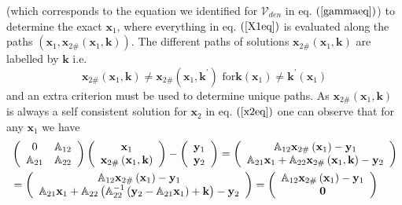 \documentclass[aps,preprint]{revtex4}%
\begin{document}
(which corresponds to the equation we identified for $\mathcal{V}_{den}$ in
eq. $\left(  \ref{gammaeq}\right)  $) to determine the exact $\mathbf{x}_{1}$,
where everything in eq. $\left(  \ref{X1eq}\right)  $ is evaluated along the
paths $\left(  \mathbf{x}_{1},\mathbf{x}_{2\#}\left(  \mathbf{x}%
_{1},\mathbf{k}\right)  \right)  $. The different paths of solutions
$\mathbf{x}_{2\#}\left(  \mathbf{x}_{1},\mathbf{k}\right)  $ are labelled by
$\mathbf{k}$ i.e.
\begin{equation}
\mathbf{x}_{2\#}\left(  \mathbf{x}_{1},\mathbf{k}\right)  \neq\mathbf{x}%
_{2\#}\left(  \mathbf{x}_{1},\mathbf{k}^{\prime}\right)  \text{ for
}\mathbf{k}\left(  \mathbf{x}_{1}\right)  \neq\mathbf{k}^{\prime}\left(
\mathbf{x}_{1}\right)
\end{equation}
and an extra criterion must be used to determine unique paths. As
$\mathbf{x}_{2\#}\left(  \mathbf{x}_{1},\mathbf{k}\right)  $ is always a self
consistent solution for $\mathbf{x}_{2}$ in eq. $\left(  \ref{x2eq}\right)  $
one can observe that for any $\mathbf{x}_{1}$ we have
\begin{align}
&  \left(
\begin{array}
[c]{cc}%
0 & \mathbb{A}_{12}\\
\mathbb{A}_{21} & \mathbb{A}_{22}%
\end{array}
\right)  \left(
\begin{array}
[c]{c}%
\mathbf{x}_{1}\\
\mathbf{x}_{2\#}\left(  \mathbf{x}_{1},\mathbf{k}\right)
\end{array}
\right)  -\left(
\begin{array}
[c]{c}%
\mathbf{y}_{1}\\
\mathbf{y}_{2}%
\end{array}
\right)  =\left(
\begin{array}
[c]{c}%
\mathbb{A}_{12}\mathbf{x}_{2\#}\left(  \mathbf{x}_{1}\right)  -\mathbf{y}%
_{1}\\
\mathbb{A}_{21}\mathbf{x}_{1}+\mathbb{A}_{22}\mathbf{x}_{2\#}\left(
\mathbf{x}_{1},\mathbf{k}\right)  -\mathbf{y}_{2}%
\end{array}
\right) \nonumber\\
&  =\left(
\begin{array}
[c]{c}%
\mathbb{A}_{12}\mathbf{x}_{2\#}\left(  \mathbf{x}_{1}\right)  -\mathbf{y}%
_{1}\\
\mathbb{A}_{21}\mathbf{x}_{1}+\mathbb{A}_{22}\left(  \mathbb{A}_{22}%
^{-1}\left(  \mathbf{y}_{2}-\mathbb{A}_{21}\mathbf{x}_{1}\right)
+\mathbf{k}\right)  -\mathbf{y}_{2}%
\end{array}
\right)  =\left(
\begin{array}
[c]{c}%
\mathbb{A}_{12}\mathbf{x}_{2\#}\left(  \mathbf{x}_{1}\right)  -\mathbf{y}%
_{1}\\
\mathbf{0}%
\end{array}
\right)
\end{align}
\end{document}
